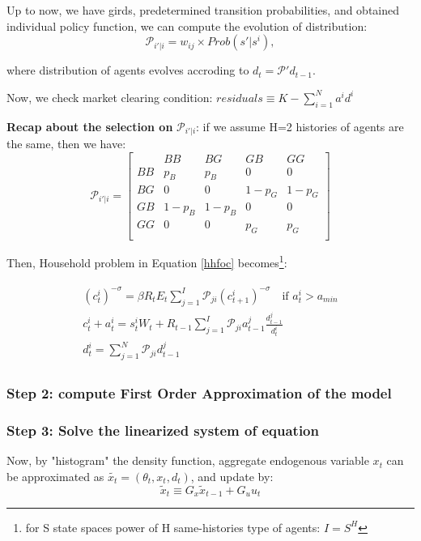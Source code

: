 Up to now, we have girds, predetermined transition probabilities, and obtained individual policy function, we can compute the {\color{red} evolution of distribution}: 
\[ \mathcal{P}_{i'|i} = w_{ij} \times Prob(s'| s^i), \]

where distribution of agents evolves accroding to $d_t = \mathcal{P'} d_{t-1}$. 

Now, we check market clearing condition: $residuals \equiv K - \sum_{i=1}^{N}a^i d^i$

\textbf{Recap about the selection on} $\mathcal{P}_{i'|i}$: if we assume H=2 histories of agents are the same, then we have: 
\[ 
\mathcal{P}_{i'|i}=
\begin{bmatrix}
& BB & BG & GB & GG \\
BB & p_B & p_B & 0 & 0\\ 
BG & 0 & 0 & 1-p_G & 1-p_G\\
GB & 1-p_B & 1-p_B & 0 & 0\\
GG & 0 & 0 & p_G & p_G\\
\end{bmatrix}
\]

Then, Household problem in Equation \ref{hhfoc} becomes\footnote{for S state spaces power of H same-histories type of agents: $I = S^H$}: 

\begin{align}
\begin{split}
(c^i_t)^{-\sigma} = \beta R_t E_t \sum_{j=1}^I \mathcal{P}_{ji} (c^i_{t+1})^{-\sigma} \quad \text{if } a^i_t > a_{min} \\
c^i_t + a^i_t = s^i_t W_t + R_{t-1} \sum_{j=1}^I \mathcal{P}_{ji} a^j_{t-1} \frac{d^j_{t-1}}{d^i_t} \\
d^i_t = \sum_{j=1}^N \mathcal{P}_{ji} d^j_{t-1}
\end{split}
\end{align}

\subsubsection*{Step 2: compute First Order Approximation of the model}

\subsubsection*{Step 3: Solve the linearized system of equation }
Now, by "histogram" the density function, aggregate endogenous variable $x_t$ can be approximated  as $\tilde{x_t} = (\theta_t, x_t, d_t)$, and update by:
\[ \tilde{x}_t \equiv G_x \tilde{x}_{t-1} + G_u u_t\]

